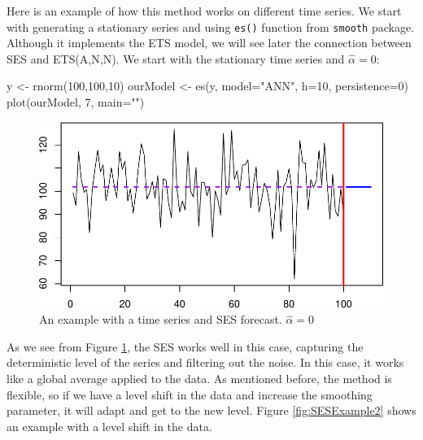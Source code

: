 \documentclass[
]{book}
\newenvironment{Shaded}{\begin{snugshade}}{\end{snugshade}}
\newcommand{\AttributeTok}[1]{\textcolor[rgb]{0.77,0.63,0.00}{#1}}
\newcommand{\DecValTok}[1]{\textcolor[rgb]{0.00,0.00,0.81}{#1}}
\newcommand{\FunctionTok}[1]{\textcolor[rgb]{0.00,0.00,0.00}{#1}}
\newcommand{\NormalTok}[1]{#1}
\newcommand{\OtherTok}[1]{\textcolor[rgb]{0.56,0.35,0.01}{#1}}
\newcommand{\StringTok}[1]{\textcolor[rgb]{0.31,0.60,0.02}{#1}}
\theoremstyle{definition}
\theoremstyle{definition}
\theoremstyle{definition}
\theoremstyle{definition}
\theoremstyle{remark}
\begin{document}
Here is an example of how this method works on different time series. We start with generating a stationary series and using \texttt{es()} function from \texttt{smooth} package. Although it implements the ETS model, we will see later the connection between SES and ETS(A,N,N). We start with the stationary time series and \(\hat{\alpha}=0\):

\begin{Shaded}
\begin{Highlighting}[]
\NormalTok{y }\OtherTok{\textless{}{-}} \FunctionTok{rnorm}\NormalTok{(}\DecValTok{100}\NormalTok{,}\DecValTok{100}\NormalTok{,}\DecValTok{10}\NormalTok{)}
\NormalTok{ourModel }\OtherTok{\textless{}{-}} \FunctionTok{es}\NormalTok{(y, }\AttributeTok{model=}\StringTok{"ANN"}\NormalTok{, }\AttributeTok{h=}\DecValTok{10}\NormalTok{, }\AttributeTok{persistence=}\DecValTok{0}\NormalTok{)}
\FunctionTok{plot}\NormalTok{(ourModel, }\DecValTok{7}\NormalTok{, }\AttributeTok{main=}\StringTok{""}\NormalTok{)}
\end{Highlighting}
\end{Shaded}

\begin{figure}
\centering
\includegraphics{Svetunkov--2022----ADAM_files/figure-latex/SESExample1-1.pdf}
\caption{\label{fig:SESExample1}An example with a time series and SES forecast. \(\hat{\alpha}=0\)}
\end{figure}

As we see from Figure \ref{fig:SESExample1}, the SES works well in this case, capturing the deterministic level of the series and filtering out the noise. In this case, it works like a global average applied to the data. As mentioned before, the method is flexible, so if we have a level shift in the data and increase the smoothing parameter, it will adapt and get to the new level. Figure \ref{fig:SESExample2} shows an example with a level shift in the data.
\end{document}
